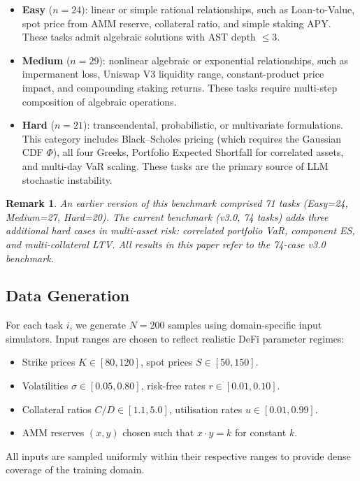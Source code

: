 \documentclass[twoside,11pt]{article}
\newtheorem{remark}[theorem]{Remark}
\begin{document}
\begin{itemize}
  \item \textbf{Easy} ($n=24$): linear or simple rational relationships, such as
    Loan-to-Value, spot price from AMM reserve, collateral ratio, and simple staking APY.
    These tasks admit algebraic solutions with AST depth $\le 3$.

  \item \textbf{Medium} ($n=29$): nonlinear algebraic or exponential relationships,
    such as impermanent loss, Uniswap V3 liquidity range, constant-product price impact,
    and compounding staking returns.  These tasks require multi-step composition
    of algebraic operations.

  \item \textbf{Hard} ($n=21$): transcendental, probabilistic, or multivariate
    formulations.  This category includes Black--Scholes pricing (which requires
    the Gaussian CDF $\Phi$), all four Greeks, Portfolio Expected Shortfall for
    correlated assets, and multi-day VaR scaling.  These tasks are the primary
    source of LLM stochastic instability.
\end{itemize}

\begin{remark}
An earlier version of this benchmark comprised 71 tasks (Easy=24, Medium=27,
Hard=20).  The current benchmark (v3.0, 74 tasks) adds three additional hard
cases in multi-asset risk: correlated portfolio VaR, component ES, and
multi-collateral LTV.  All results in this paper refer to the 74-case v3.0 benchmark.
\end{remark}

\subsection{Data Generation}
\label{sec:bench_datagen}

For each task $i$, we generate $N=200$ samples using domain-specific input
simulators.  Input ranges are chosen to reflect realistic DeFi parameter regimes:
\begin{itemize}
  \item Strike prices $K \in [80, 120]$, spot prices $S \in [50, 150]$.
  \item Volatilities $\sigma \in [0.05, 0.80]$, risk-free rates $r \in [0.01, 0.10]$.
  \item Collateral ratios $C/D \in [1.1, 5.0]$, utilisation rates $u \in [0.01, 0.99]$.
  \item AMM reserves $(x, y)$ chosen such that $x \cdot y = k$ for constant $k$.
\end{itemize}
All inputs are sampled uniformly within their respective ranges to provide dense
coverage of the training domain.
\end{document}
